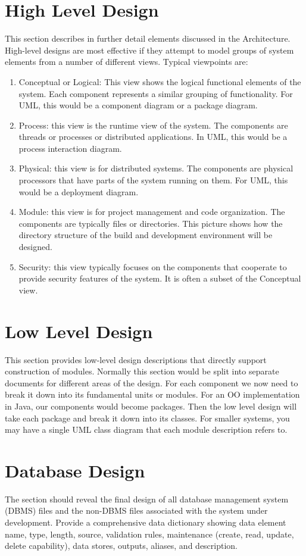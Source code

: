 \section{High Level Design}
This section describes in further detail elements discussed in the Architecture. 
High-level designs are most effective if they attempt to model groups of system elements from a number of different views.  Typical viewpoints are: 
\begin{enumerate}
	\item   Conceptual or Logical: This view shows the logical functional elements of the system.  Each component represents a similar grouping of functionality.  For UML, this would be a component diagram or a package diagram.
	\item   Process:  this view is the runtime view of the system.  The components are threads or processes or distributed applications.  In UML, this would be a process interaction diagram.
	\item   Physical:  this view is for distributed systems. The components are physical processors that have parts of the system running on them.  For UML, this would be a deployment diagram.
	\item   Module:  this view is for project management and code organization.  The components are typically files or directories.  This picture shows how the directory structure of the build and development environment will be designed.
	\item   Security: this view typically focuses on the components that cooperate to provide security features of the system.  It is often a subset of the Conceptual view.
\end{enumerate}

\section{Low Level Design}
This section provides low-level design descriptions that directly support construction of modules. Normally this section would be split into separate documents for different areas of the design.  For each component we now need to break it down into its fundamental units or modules.  For an OO implementation in Java, our components would become packages.  Then the low level design will take each package and break it down into its classes.  For smaller systems, you may have a single UML class diagram that each module description refers to.

\section{Database Design}
The section should reveal the final design of all database management system (DBMS) files and the non-DBMS files associated with the system under development.  Provide a comprehensive data dictionary showing data element name, type, length, source, validation rules, maintenance (create, read, update, delete capability), data stores, outputs, aliases, and description.

